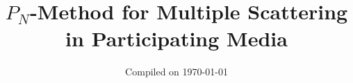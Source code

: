

\title[Draft]%
{
$P_N$-Method for Multiple Scattering in Participating Media
}


\author
{
Compiled on \today
\\
}



%



